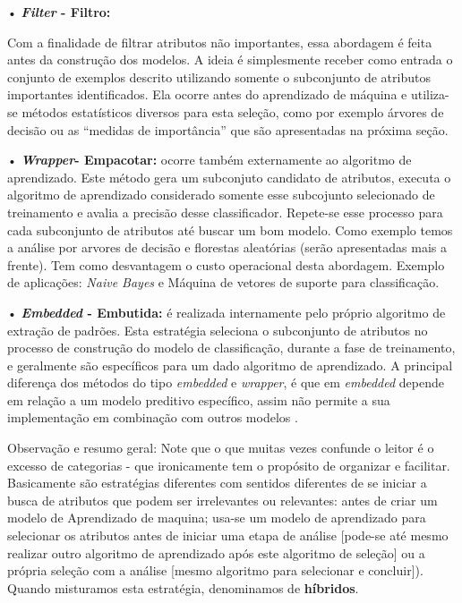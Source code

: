 \documentclass[
]{book}
\begin{document}
• \textbf{\emph{Filter} - Filtro:}

Com a finalidade de filtrar atributos não importantes, essa abordagem é feita antes da construção dos modelos. A ideia é simplesmente receber como entrada o
conjunto de exemplos descrito utilizando somente o subconjunto de atributos importantes identificados. Ela ocorre antes do aprendizado de máquina \citep{john1994irrelevant} e utiliza-se métodos estatísticos diversos para esta seleção, como por exemplo árvores de decisão ou as ``medidas de importância'' que são apresentadas na próxima seção.

• \textbf{\emph{Wrapper}- Empacotar:} ocorre também externamente ao algoritmo de aprendizado. Este método gera um subconjuto candidato de atributos, executa o algoritmo de aprendizado considerado somente esse subcojunto selecionado de treinamento e avalia a precisão desse classificador. Repete-se esse processo para cada subconjunto de atributos até buscar um bom modelo. Como exemplo temos a análise por arvores de decisão e florestas aleatórias (serão apresentadas mais a frente). Tem como desvantagem o custo operacional desta abordagem. Exemplo de aplicações: \emph{Naive Bayes} e Máquina de vetores de suporte para classificação.

• \textbf{\emph{Embedded} - Embutida:} é realizada internamente pelo próprio algoritmo de extração de padrões. Esta estratégia seleciona o subconjunto de atributos no processo de construção do modelo de classificação, durante a fase de treinamento, e geralmente são específicos para um dado algoritmo de aprendizado. A principal diferença dos métodos do tipo \emph{embedded} e \emph{wrapper},
é que em \emph{embedded} depende em relação a um modelo preditivo específico, assim não permite a sua implementação em combinação com outros modelos \citep{souza2014computational}.

Observação e resumo geral: Note que o que muitas vezes confunde o leitor é o excesso de categorias - que ironicamente tem o propósito de organizar e facilitar. Basicamente são estratégias diferentes com sentidos diferentes de se iniciar a busca de atributos que podem ser irrelevantes ou relevantes: antes de criar um modelo de Aprendizado de maquina; usa-se um modelo de aprendizado para selecionar os atributos antes de iniciar uma etapa de análise {[}pode-se até mesmo realizar outro algoritmo de aprendizado após este algoritmo de seleção{]} ou a própria seleção com a análise {[}mesmo algoritmo para selecionar e concluir{]}). Quando misturamos esta estratégia, denominamos de \textbf{híbridos}.
\end{document}
